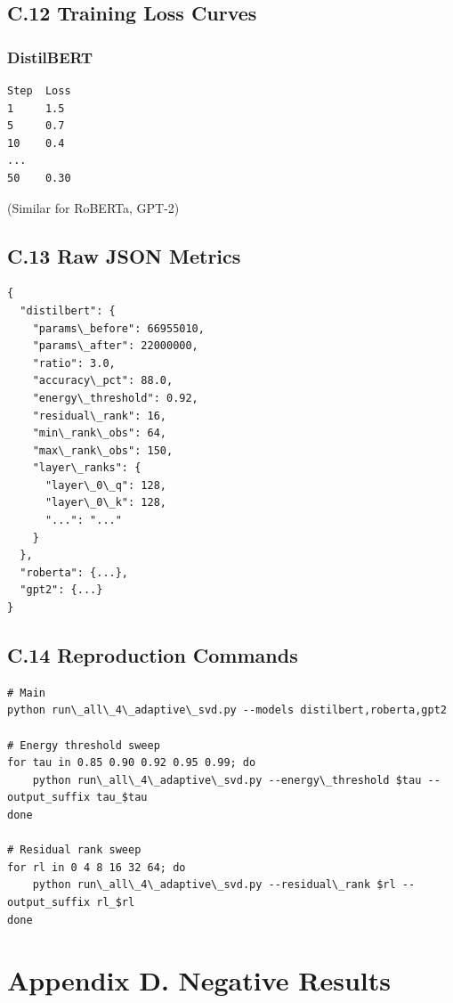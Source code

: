 \subsection{C.12 Training Loss Curves}

\subsubsection{DistilBERT}
\begin{lstlisting}
Step  Loss
1     1.5
5     0.7
10    0.4
...
50    0.30
\end{lstlisting}

(Similar for RoBERTa, GPT-2)

\subsection{C.13 Raw JSON Metrics}

\begin{lstlisting}
{
  "distilbert": {
    "params\_before": 66955010,
    "params\_after": 22000000,
    "ratio": 3.0,
    "accuracy\_pct": 88.0,
    "energy\_threshold": 0.92,
    "residual\_rank": 16,
    "min\_rank\_obs": 64,
    "max\_rank\_obs": 150,
    "layer\_ranks": {
      "layer\_0\_q": 128,
      "layer\_0\_k": 128,
      "...": "..."
    }
  },
  "roberta": {...},
  "gpt2": {...}
}
\end{lstlisting}

\subsection{C.14 Reproduction Commands}

\begin{lstlisting}
# Main
python run\_all\_4\_adaptive\_svd.py --models distilbert,roberta,gpt2

# Energy threshold sweep
for tau in 0.85 0.90 0.92 0.95 0.99; do
    python run\_all\_4\_adaptive\_svd.py --energy\_threshold $tau --output_suffix tau_$tau
done

# Residual rank sweep
for rl in 0 4 8 16 32 64; do
    python run\_all\_4\_adaptive\_svd.py --residual\_rank $rl --output_suffix rl_$rl
done
\end{lstlisting}


\section{Appendix D. Negative Results}

